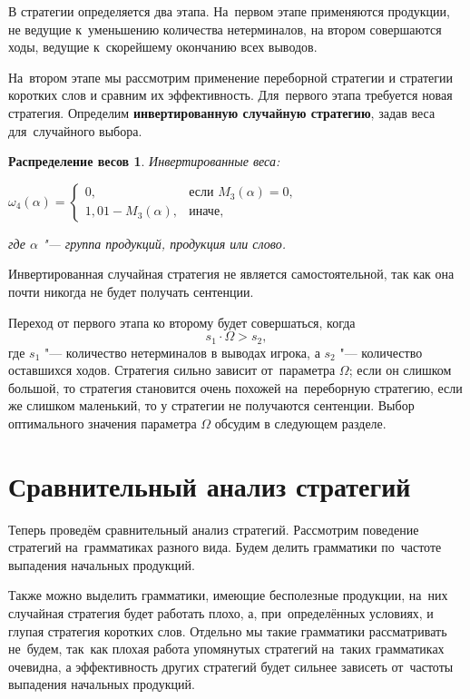 \documentclass{csmathnotes}
\newtheorem{weight}{Распределение весов}
\begin{document}
В стратегии определяется два этапа. На~первом этапе применяются продукции, не ведущие к~уменьшению количества нетерминалов, на втором совершаются ходы, ведущие к~скорейшему окончанию всех выводов.

На~втором этапе мы рассмотрим применение переборной стратегии и стратегии коротких слов и сравним их эффективность. Для~первого этапа требуется новая стратегия. Определим \textbf{инвертированную случайную стратегию}, задав веса для~случайного выбора.

\begin{weight}
	\label{weight4}
	Инвертированные веса:
	
	\begin{math}
		\omega_4(\alpha) = \begin{cases} 0, & \text{если } M_3(\alpha)=0,\\
			1{,}01 - M_3(\alpha), & \text{иначе},
		\end{cases}
	\end{math}
	
	
	\noindent где $\alpha$ "--- группа продукций, продукция или слово.
\end{weight}

Инвертированная случайная стратегия не является самостоятельной, так как она почти никогда не будет получать сентенции.

Переход от первого этапа ко второму будет совершаться, когда \[s_1 \cdot \Omega > s_2,\] где $s_1$ "--- количество нетерминалов в выводах игрока, а $s_2$ "--- количество оставшихся ходов. Стратегия сильно зависит от~параметра $\Omega$; если он слишком большой, то стратегия становится очень похожей на~переборную стратегию, если же слишком маленький, то у стратегии не получаются сентенции. Выбор оптимального значения параметра $\Omega$ обсудим в следующем разделе.

\section*{Сравнительный анализ стратегий}
\label{chap:analysis}
Теперь проведём сравнительный анализ стратегий. Рассмотрим поведение стратегий на~грамматиках разного вида. Будем делить грамматики по~частоте выпадения начальных продукций.

Также можно выделить грамматики, имеющие бесполезные продукции, на~них случайная стратегия будет работать плохо, а, при~определённых условиях, и глупая стратегия коротких слов. Отдельно мы такие грамматики рассматривать не~будем, так~как плохая работа упомянутых стратегий на~таких грамматиках очевидна, а эффективность других стратегий будет сильнее зависеть от~частоты выпадения начальных продукций.
\end{document}
